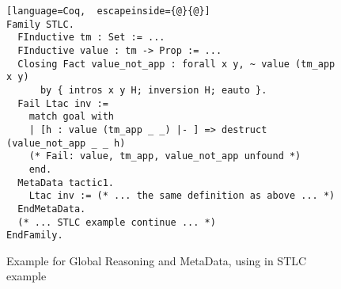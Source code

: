 \begin{figure}[!htb]
\begin{lstlisting}[language=Coq,  escapeinside={@}{@}]
Family STLC.
  FInductive tm : Set := ... 
  FInductive value : tm -> Prop := ... 
  Closing Fact value_not_app : forall x y, ~ value (tm_app x y) 
      by { intros x y H; inversion H; eauto }.
  Fail Ltac inv := 
    match goal with 
    | [h : value (tm_app _ _) |- ] => destruct (value_not_app _ _ h)
    (* Fail: value, tm_app, value_not_app unfound *)
    end. 
  MetaData tactic1.
    Ltac inv := (* ... the same definition as above ... *)
  EndMetaData.
  (* ... STLC example continue ... *)
EndFamily.
\end{lstlisting}  
\caption{Example for Global Reasoning and MetaData, using in STLC example}\label{fig:plugin-example-global-reasoning-meta-data}
\end{figure}



